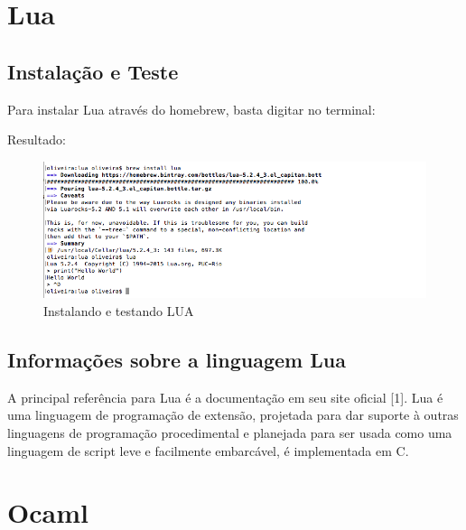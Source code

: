 \documentclass[12pt,a4paper,twoside]{report}
\begin{document}
\section{Lua}
\subsection{Instalação e Teste}
Para instalar Lua através do homebrew, basta digitar no terminal:
Resultado:
\begin{figure}[!ht]
\centering
\caption{Instalando e testando LUA}
\includegraphics[scale=0.27]{imagens/brew-lua.png}
\end{figure}
\subsection{Informações sobre a linguagem Lua}
A principal referência para Lua é a documentação em seu site oficial [1].
Lua é uma linguagem de programação de extensão, projetada para dar suporte à outras linguagens de programação procedimental e planejada para ser usada como uma linguagem de script leve e facilmente embarcável, é implementada em C.



\section{Ocaml}
\end{document}
